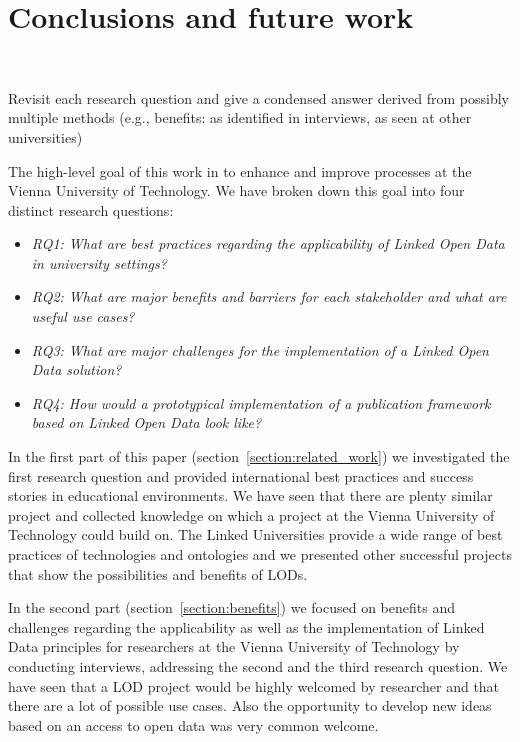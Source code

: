 \section{Conclusions and future work}~\label{section:conclusion}

Revisit each research question and give a condensed answer derived from possibly multiple methods (e.g., benefits: as identified in interviews, as seen at other universities)

The high-level goal of this work in to enhance and improve processes at the Vienna University of Technology. We have broken down this goal into four distinct research questions:

\begin{itemize}
	\item \textit{RQ1: What are best practices regarding the applicability of Linked Open Data in university settings?}
	\item \textit{RQ2: What are major benefits and barriers for each stakeholder and what are useful use cases?}
	\item \textit{RQ3: What are major challenges for the implementation of a Linked Open Data solution?}
	\item \textit{RQ4: How would a prototypical implementation of a publication framework based on Linked Open Data look like?}
\end{itemize}

In the first part of this paper (section~\ref{section:related_work}) we investigated the first research question and provided international best practices and success stories in educational environments. We have seen that there are plenty similar project and collected knowledge on which a project at the Vienna University of Technology could build on. The Linked Universities provide a wide range of best practices of technologies and ontologies and we presented other successful projects that show the possibilities and benefits of LODs.

In the second part (section~\ref{section:benefits}) we focused on benefits and challenges regarding the applicability as well as the implementation of Linked Data principles for researchers at the Vienna University of Technology by conducting interviews, addressing the second and the third research question. We have seen that a LOD project would be highly welcomed by researcher and that there are a lot of possible use cases. Also the opportunity to develop new ideas based on an access to open data was very common welcome.


